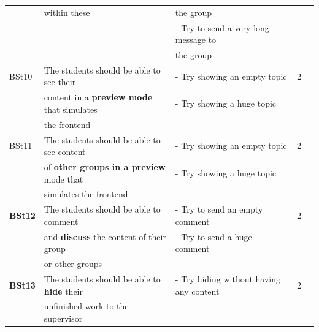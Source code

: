 {\begin{landscape}
\begin{center}
\begin{longtable}{|l|l|lll|}
		& within these									& the group	& \\
		& 											& - Try to send a very long message to	& \\
		& 											& the group	& \\
	\hline
	BSt10& The students should be able to see their 			& - Try showing an empty topic 	& 2\\
		& content in a \textbf{preview mode} that simulates	& - Try showing a huge topic	&	\\
		& the frontend									&	& \\
	\hline
	BSt11& The students should be able to see content 		& -  Try showing an empty topic & 2\\
		& of \textbf{other groups in a preview} mode that 		& - Try showing a huge topic	&	\\
		& simulates the frontend							&	& \\
	\hline
	\textbf{BSt12}& The students should be able to comment  			& - Try to send an empty comment  & 2\\
		& and \textbf{discuss} the content of their group		& - Try to send a huge comment	 & \\
		& or other groups								&	 & \\
	\hline
	\textbf{BSt13}& The students should be able to \textbf{hide} their 	& - Try hiding without having any content & 2\\
		& unfinished work to the supervisor					&	& \\
\end{longtable}
\end{center} 
    \end{landscape}
    \clearpage%
}

